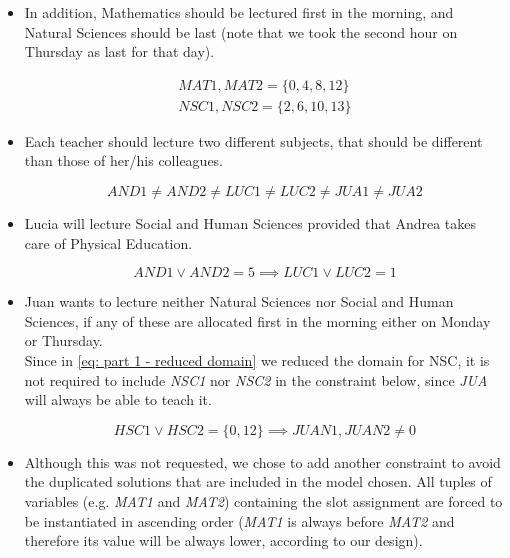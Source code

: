 \begin{itemize}
    \item In addition, Mathematics should be lectured first in the morning, and Natural Sciences should be last (note that we took the second hour on Thursday as last for that day).
    
    \begin{gather}
        MAT1, MAT2 = \{ 0, 4, 8, 12 \}\\
        NSC1, NSC2 = \{ 2, 6, 10, 13 \}
    \end{gather}
    
    \item Each teacher should lecture two different subjects, that should be different than those of her/his colleagues.
    
    \begin{equation}
        AND1 \neq AND2 \neq LUC1 \neq LUC2 \neq JUA1 \neq JUA2
    \end{equation}
    
    \item Lucia will lecture Social and Human Sciences provided that Andrea takes care of Physical Education.
    
    \begin{equation}
        AND1 \lor AND2 = 5 \implies LUC1 \lor LUC2 = 1
    \end{equation}
    
    \item Juan wants to lecture neither Natural Sciences nor Social and Human Sciences, if any of these are allocated first in the morning either on Monday or Thursday.\\
    Since in \ref{eq: part 1 - reduced domain} we reduced the domain for NSC, it is not required to include \textit{NSC1} nor \textit{NSC2} in the constraint below, since \textit{JUA} will always be able to teach it.
    
    \begin{equation}
        HSC1 \lor HSC2 = \{ 0, 12 \} \implies JUAN1, JUAN2 \neq 0
    \end{equation}
    
    \item Although this was not requested, we chose to add another constraint to avoid the duplicated solutions that are included in the model chosen. All tuples of variables (e.g. \textit{MAT1} and \textit{MAT2}) containing the slot assignment are forced to be instantiated in ascending order (\textit{MAT1} is always before \textit{MAT2} and therefore its value will be always lower, according to our design).
    

\end{itemize}
